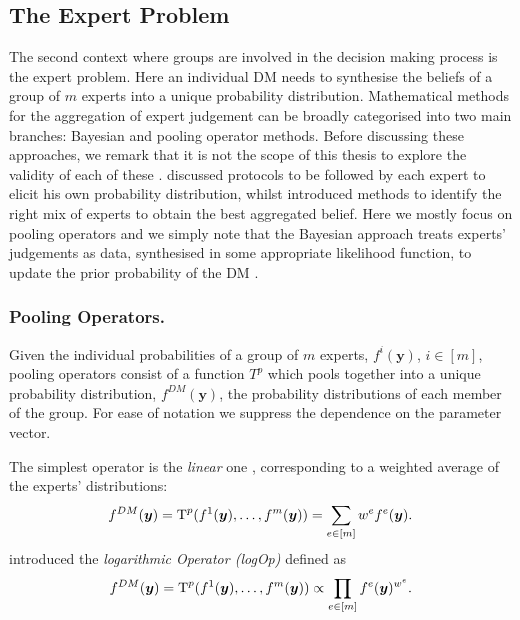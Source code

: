 \subsection{The Expert Problem}
\label{sec:expert}

The second context where groups are involved in the decision making process is the expert problem. Here an individual DM needs to synthesise the beliefs of a group of $m$ experts into a unique probability distribution. Mathematical methods for the aggregation of expert judgement can be broadly categorised into two main branches: Bayesian and pooling operator methods. Before discussing these approaches, we remark that it is not the scope of this thesis to explore the validity of each of these \citep[see e.g.][and the references therein for an extensive discussion]{Clemen99,French2011}. \citet{O'Hagan2006a} discussed protocols to be followed by each expert to elicit his own probability distribution, whilst \citet{Merrick2008} introduced methods to identify the right mix of experts to obtain the best aggregated belief. Here we mostly focus on pooling operators and we simply note that the Bayesian approach treats experts' judgements as data, synthesised in some appropriate likelihood function, to update the prior probability of the DM \citep[see e.g.][]{French1980, Mumpower1996,Wiper1995c,Albert2012}.

\subsubsection{Pooling Operators.}
\label{sec:pool}
Given the individual probabilities of a group of $m$ experts, $f^i(\bm{y})$, $i\in[m]$, pooling operators consist of a function  $T^p$ which pools together into a unique probability distribution, $f^{DM}(\bm{y})$, the probability distributions of each member of the group. For ease of notation we suppress the dependence on the parameter vector.

The simplest operator is the \textit{linear} one \citep{Stone1961}, corresponding to a weighted average of the experts' distributions:
\begin{equation*}
\label{eq:linearpool}
f^{DM}(\bm{y})=\T^p(f^1(\bm{y}),\dots, f^m(\bm{y}))=\sum_{e\in[m]} w^ef^e(\bm{y}).
\end{equation*} 
\citet{Bacharach1975} introduced the \textit{logarithmic Operator (logOp)} defined as
\begin{equation*}
\label{eq:logpool}
f^{DM}(\bm{y})=\T^p(f^1(\bm{y}),\dots, f^m(\bm{y}))\propto\prod_{e\in[m]}f^e(\bm{y})^{w^e}.
\end{equation*}

